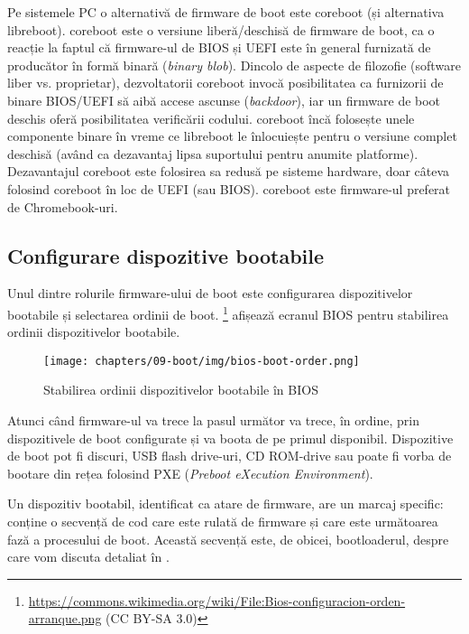 Pe sistemele PC o alternativă de firmware de boot este coreboot (și alternativa libreboot).
coreboot este o versiune liberă/deschisă de firmware de boot, ca o reacție la faptul că firmware-ul de BIOS și UEFI este în general furnizată de producător în formă binară (\textit{binary blob}).
Dincolo de aspecte de filozofie (software liber vs. proprietar), dezvoltatorii coreboot invocă posibilitatea ca furnizorii de binare BIOS/UEFI să aibă accese ascunse (\textit{backdoor}), iar un firmware de boot deschis oferă posibilitatea verificării codului.
coreboot încă folosește unele componente binare în vreme ce libreboot le înlocuiește pentru o versiune complet deschisă (având ca dezavantaj lipsa suportului pentru anumite platforme).
 Dezavantajul coreboot este folosirea sa redusă pe sisteme hardware, doar câteva folosind coreboot în loc de UEFI (sau BIOS).
coreboot este firmware-ul preferat de Chromebook-uri.

\subsection{Configurare dispozitive bootabile}
\label{sec:boot:device-config}

Unul dintre rolurile firmware-ului de boot este configurarea dispozitivelor bootabile și selectarea ordinii de boot.
\footnote{\url{https://commons.wikimedia.org/wiki/File:Bios-configuracion-orden-arranque.png} (CC BY-SA 3.0)} afișează ecranul BIOS pentru stabilirea ordinii dispozitivelor bootabile.

\begin{figure}[!htbp]
  \centering
  \texttt{[image: chapters/09-boot/img/bios-boot-order.png]}
  \caption{Stabilirea ordinii dispozitivelor bootabile în BIOS}
  \label{fig:boot:bios-boot-order}
\end{figure}

Atunci când firmware-ul va trece la pasul următor va trece, în ordine, prin dispozitivele de boot configurate și va boota de pe primul disponibil.
 Dispozitive de boot pot fi discuri, USB flash drive-uri, CD ROM-drive sau poate fi vorba de bootare din rețea folosind PXE  (\textit{Preboot eXecution Environment}).

Un dispozitiv bootabil, identificat ca atare de firmware, are un marcaj specific: conține o secvență de cod care este rulată de firmware și care este următoarea fază a procesului de boot.
Această secvență este, de obicei, bootloaderul, despre care vom discuta detaliat în .

